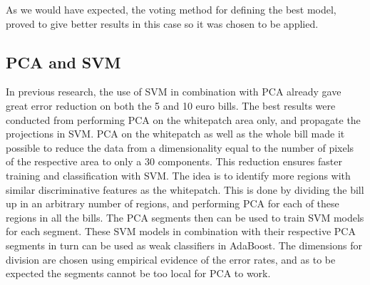 \documentclass[11pt,twocolumn]{article}
\begin{document}
			As we would have expected, the voting method for defining the best model, proved to give better results in this case so it was chosen to be applied.

		\subsection{PCA and SVM}\label{sec:PCA}
			In previous research, the use of SVM in combination with PCA already gave great error reduction on both the 5 and 10 euro bills. The best results were conducted from performing PCA on the whitepatch area only, and propagate the projections in SVM. PCA on the whitepatch as well as the whole bill made it possible to reduce the data from a dimensionality equal to the number of pixels of the respective area to only a 30 components. This reduction ensures faster training and classification with SVM. The idea is to identify more regions with similar discriminative features as the whitepatch. This is done by dividing the bill up in an arbitrary number of regions, and performing PCA for each of these regions in all the bills. The PCA segments then can be used to train SVM models for each segment. These SVM models in combination with their respective PCA segments in turn can be used as weak classifiers in AdaBoost. The dimensions for division are chosen using empirical evidence of the error rates, and as to be expected the segments cannot be too local for PCA to work.
\end{document}
